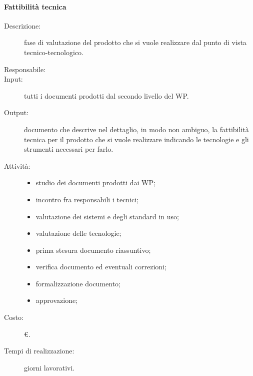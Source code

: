 \paragraph{Fattibilità tecnica}
\begin{description}
\item[Descrizione:] fase di valutazione del prodotto che si vuole realizzare dal punto di vista tecnico-tecnologico.
\item[Responsabile:] 
\item[Input:] tutti i documenti prodotti dal secondo livello del WP.
\item[Output:] documento che descrive nel dettaglio, in modo non ambiguo, la fattibilità tecnica per il prodotto che si vuole realizzare indicando le tecnologie e gli strumenti necessari per farlo.
\item[Attività:]
\begin{itemize}
\item studio dei documenti prodotti dai WP;
\item incontro fra responsabili i tecnici;
\item valutazione dei sistemi e degli standard in uso;
\item valutazione delle tecnologie;
\item prima stesura documento riassuntivo;
\item verifica documento ed eventuali correzioni;
\item formalizzazione documento;
\item approvazione;
\end{itemize}
\item[Costo:] \euro{}.
\item[Tempi di realizzazione:]  giorni lavorativi.
\end{description}

